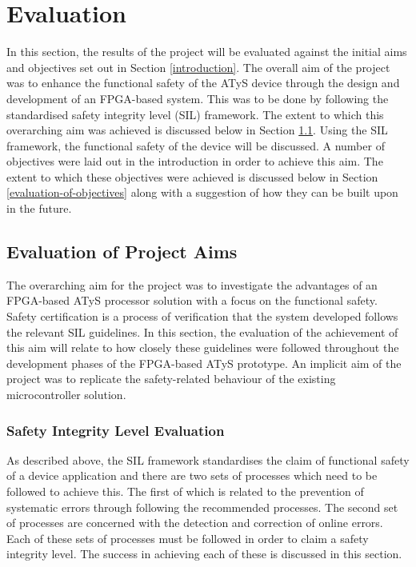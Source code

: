 \chapter{Evaluation}
\label{evaluation}

In this section, the results of the project will be evaluated against the initial aims and objectives set out in Section \ref{introduction}. The overall aim of the project was to enhance the functional safety of the ATyS device through the design and development of an FPGA-based system. This was to be done by following the standardised safety integrity level (SIL) framework. The extent to which this overarching aim was achieved is discussed below in Section \ref{evaluation-of-aims}. Using the SIL framework, the functional safety of the device will be discussed. A number of objectives were laid out in the introduction in order to achieve this aim. The extent to which these objectives were achieved is discussed below in Section \ref{evaluation-of-objectives} along with a suggestion of how they can be built upon in the future.


\section{Evaluation of Project Aims}
\label{evaluation-of-aims}
The overarching aim for the project was to investigate the advantages of an FPGA-based ATyS processor solution with a focus on the functional safety. Safety certification is a process of verification that the system developed follows the relevant SIL guidelines. In this section, the evaluation of the achievement of this aim will relate to how closely these guidelines were followed throughout the development phases of the FPGA-based ATyS prototype. An implicit aim of the project was to replicate the safety-related behaviour of the existing microcontroller solution. 

\subsection{Safety Integrity Level Evaluation}

As described above, the SIL framework standardises the claim of functional safety of a device application and there are two sets of processes which need to be followed to achieve this\cite{IEC61508}. The first of which is related to the prevention of systematic errors through following the recommended processes. The second set of processes are concerned with the detection and correction of online errors. Each of these sets of processes must be followed in order to claim a safety integrity level. The success in achieving each of these is discussed in this section.

